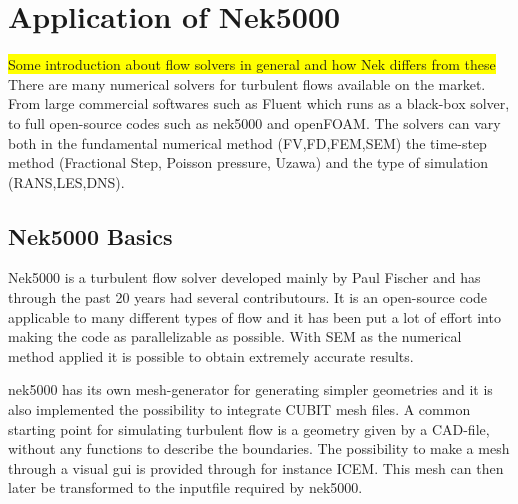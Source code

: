 
\chapter{Application of Nek5000} %

\label{problem} %


\colorbox{yellow}{Some introduction about flow solvers in general and how Nek differs from these}
There are many numerical solvers for turbulent flows available on the market.
From large commercial softwares such as Fluent which runs as a 
black-box solver, to full open-source codes such as nek5000 and openFOAM. 
The solvers can vary both in the fundamental numerical method (FV,FD,FEM,SEM) 
the time-step method (Fractional Step, Poisson pressure, Uzawa) 
and the type of simulation (RANS,LES,DNS).


\section{Nek5000 Basics }
Nek5000 is a turbulent flow solver developed mainly by Paul Fischer
and has through the past 20 years had several contributours. 
It is an open-source code applicable to many different types of flow 
and it has been put a lot of effort into making the code as parallelizable as possible.
With SEM as the numerical method applied it is possible to obtain extremely accurate results.  

nek5000 has its own mesh-generator for generating simpler geometries and it is also implemented the possibility to integrate CUBIT mesh 
files. A common starting point for simulating turbulent flow is a geometry given by a CAD-file,
without any functions to describe the boundaries.
The possibility to make a mesh through a visual gui is provided through for instance ICEM.
This mesh can then later be transformed to the inputfile required by nek5000. 

